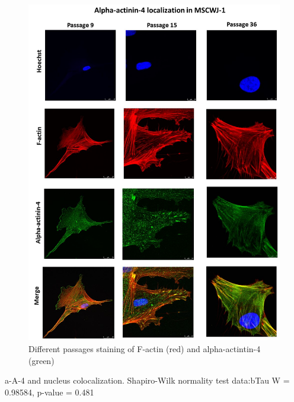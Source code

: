 \documentclass[english,authoryear]{elsarticle}
\begin{document}
\begin{figure}[hbt!]
\centering
\includegraphics[width=0.9\linewidth]{fig_a4-actin.jpg}
\caption{Different passages staining of F-actin (red) and alpha-actintin-4 (green)}
\label{a4-actin}
\end{figure}

a-A-4 and nucleus colocalization.
Shapiro-Wilk normality test data:bTau W = 0.98584, p-value = 0.481
\end{document}
